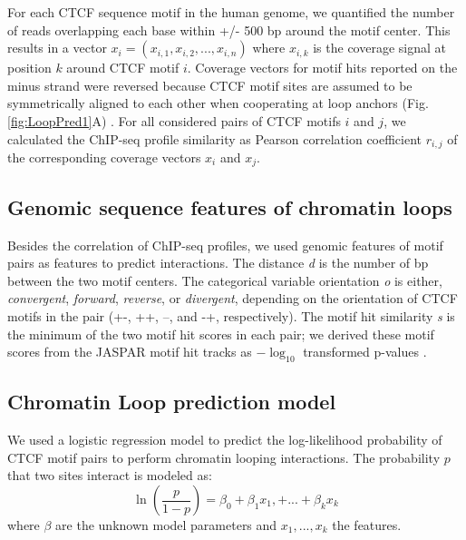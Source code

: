 \documentclass[a4paper,twoside=true,openright,parskip=full,chapterprefix=true,11pt,headings=normal,bibliography=totoc,listof=totoc,titlepage=on,captions=tableabove,draft=false]{scrreprt}
\theoremstyle{definition}
\theoremstyle{definition}
\theoremstyle{definition}
\theoremstyle{remark}
\begin{document}
For each CTCF sequence motif in the human genome, we quantified the
number of reads overlapping each base within +/- 500 bp around the motif
center. This results in a vector
\(x_i = (x_{i,1}, x_{i,2}, ..., x_{i,n})\) where \(x_{i,k}\) is the
coverage signal at position \(k\) around CTCF motif \(i\). Coverage
vectors for motif hits reported on the minus strand were reversed
because CTCF motif sites are assumed to be symmetrically aligned to each
other when cooperating at loop anchors (Fig. \ref{fig:LoopPred1}A)
\citep{Rao2014, Tang2015, Guo2015, deWit2015, Sanborn2015}. For all
considered pairs of CTCF motifs \(i\) and \(j\), we calculated the
ChIP-seq profile similarity as Pearson correlation coefficient
\(r_{i,j}\) of the corresponding coverage vectors \(x_i\) and \(x_j\).

\hypertarget{genomic-sequence-features-of-chromatin-loops}{%
\subsection{Genomic sequence features of chromatin
loops}\label{genomic-sequence-features-of-chromatin-loops}}

Besides the correlation of ChIP-seq profiles, we used genomic features
of motif pairs as features to predict interactions. The distance
\emph{d} is the number of bp between the two motif centers. The
categorical variable orientation \emph{o} is either, \emph{convergent},
\emph{forward}, \emph{reverse}, or \emph{divergent}, depending on the
orientation of CTCF motifs in the pair (+-, ++, --, and -+,
respectively). The motif hit similarity \emph{s} is the minimum of the
two motif hit scores in each pair; we derived these motif scores from
the JASPAR motif hit tracks as \(-\log_{10}\) transformed p-values
\citep{Khan2018}.

\hypertarget{chromatin-loop-prediction-model}{%
\subsection{Chromatin Loop prediction
model}\label{chromatin-loop-prediction-model}}

We used a logistic regression model to predict the log-likelihood
probability of CTCF motif pairs to perform chromatin looping
interactions. The probability \(p\) that two sites interact is modeled
as: \[
\ln (\frac{p}{1-p}) = \beta_0 + \beta_1 x_1, + ... + \beta_k x_k
\] where \(\beta\) are the unknown model parameters and
\(x_1, ..., x_k\) the features.
\end{document}
